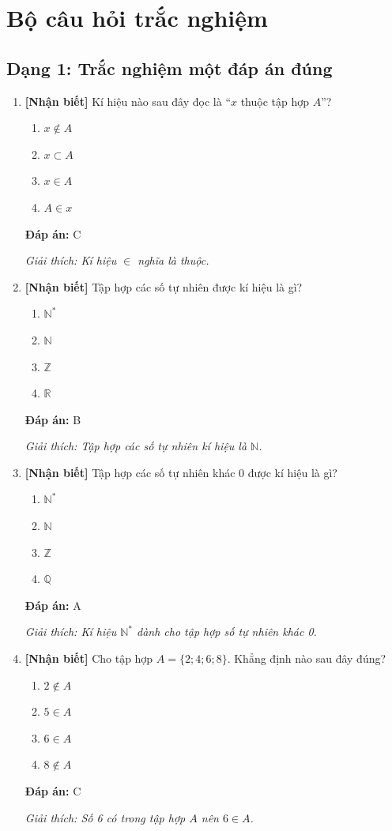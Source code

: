 \documentclass[12pt,a4paper]{article}
\newcommand{\nhanbiet}{\textcolor{nhanbiet}{\textbf{[Nhận biết]}}}
\newcommand{\dapan}[1]{\par\smallskip\textbf{Đáp án:} #1}
\newcommand{\giaithich}[1]{\par\textit{Giải thích: #1}}
\begin{document}
\section{Bộ câu hỏi trắc nghiệm}

\subsection*{Dạng 1: Trắc nghiệm một đáp án đúng}

\begin{enumerate}[label=\textbf{Câu \arabic*.}]
    \item \nhanbiet{} Kí hiệu nào sau đây đọc là ``$x$ thuộc tập hợp $A$''?
    \begin{enumerate}[label=\Alph*.]
        \item $x \notin A$
        \item $x \subset A$
        \item $x \in A$
        \item $A \in x$
    \end{enumerate}
    \dapan{C}
    \giaithich{Kí hiệu $\in$ nghĩa là thuộc.}

    \item \nhanbiet{} Tập hợp các số tự nhiên được kí hiệu là gì?
    \begin{enumerate}[label=\Alph*.]
        \item $\mathbb{N}^*$
        \item $\mathbb{N}$
        \item $\mathbb{Z}$
        \item $\mathbb{R}$
    \end{enumerate}
    \dapan{B}
    \giaithich{Tập hợp các số tự nhiên kí hiệu là $\mathbb{N}$.}

    \item \nhanbiet{} Tập hợp các số tự nhiên khác 0 được kí hiệu là gì?
    \begin{enumerate}[label=\Alph*.]
        \item $\mathbb{N}^*$
        \item $\mathbb{N}$
        \item $\mathbb{Z}$
        \item $\mathbb{Q}$
    \end{enumerate}
    \dapan{A}
    \giaithich{Kí hiệu $\mathbb{N}^*$ dành cho tập hợp số tự nhiên khác 0.}

    \item \nhanbiet{} Cho tập hợp $A = \{2; 4; 6; 8\}$. Khẳng định nào sau đây đúng?
    \begin{enumerate}[label=\Alph*.]
        \item $2 \notin A$
        \item $5 \in A$
        \item $6 \in A$
        \item $8 \notin A$
    \end{enumerate}
    \dapan{C}
    \giaithich{Số 6 có trong tập hợp $A$ nên $6 \in A$.}


\end{enumerate}
\end{document}
